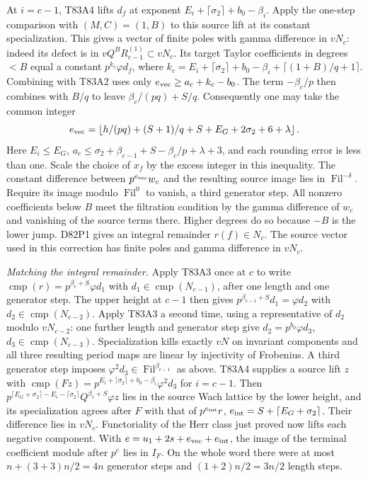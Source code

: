 At $i=c-1$, T83A4 lifts $d_f$ at exponent
$E_i+\lceil\sigma_2\rceil+b_0-\beta_i$.
Apply the one-step comparison with $(M,C)=(1,B)$ to this source
lift at its constant specialization. This gives a vector of
finite poles with gamma difference in $vN_c$: indeed its defect
is in $vQ^B R_{c-1}^{(1)}\subset vN_c$. Its target Taylor
coefficients in degrees $<B$ equal a constant
$p^{k_c}\varphi d_f$, where
$k_c=E_i+\lceil\sigma_2\rceil+b_0-\beta_i+
\lceil(1+B)/q+1\rceil$. Combining with T83A2 uses only
$e_{\rm vec}\ge a_c+k_c-b_0$. The term $-\beta_c/p$
then combines with $B/q$ to leave $\beta_c/(pq)+S/q$.
Consequently one may take the common integer
\[
 e_{\rm vec}=\left\lfloor h/(pq)+(S+1)/q+S+
              E_G+2\sigma_2+6+\lambda\right\rfloor .
\]
Here $E_i\le E_G$, $a_c\le\sigma_2+\beta_{c-1}+S-
\beta_c/p+\lambda+3$, and each rounding error is less than
one. Scale the choice of $x_f$ by the excess integer in this
inequality. The constant difference between $p^{e_{\rm vec}}w_c$
and the resulting source image lies in $\operatorname{Fil}^{-\delta}$.
Require its image modulo $\operatorname{Fil}^0$ to vanish, a third
generator step. All nonzero coefficients below $B$ meet the
filtration condition by the gamma difference of $w_c$ and
vanishing of the source terms there. Higher degrees do so because
$-B$ is the lower jump. D82P1 gives an integral remainder
$r(f)\in N_c$. The source vector used in this correction has
finite poles and gamma difference in $vN_c$.

\emph{Matching the integral remainder.}
Apply T83A3 once at $c$ to write
$\operatorname{cmp}(r)=p^{\beta_c+S}\varphi d_1$
with $d_1\in\operatorname{cmp}(N_{c-1})$, after one length
and one generator step. The upper height at $c-1$ then gives
$p^{\beta_{c-1}+S}d_1=\varphi d_2$ with
$d_2\in\operatorname{cmp}(N_{c-2})$. Apply T83A3 a second
time, using a representative of $d_2$ modulo $vN_{c-2}$:
one further length and generator step give
$d_2=p^{b_0}\varphi d_3$, $d_3\in\operatorname{cmp}(N_{c-3})$.
Specialization kills exactly $vN$ on invariant components and all
three resulting period maps are linear by injectivity of Frobenius.
A third generator step imposes
$\varphi^2d_3\in\operatorname{Fil}^{\beta_{c-1}}$ as above.
T83A4 supplies a source lift $z$ with
$\operatorname{cmp}(Fz)=p^{E_i+\lceil\sigma_2\rceil+b_0-\beta_i}
 \varphi^2d_3$ for $i=c-1$.
Then $p^{\lceil E_G+\sigma_2\rceil-E_i-\lceil\sigma_2\rceil}
Q^{\beta_c+S}\varphi z$ lies in the source Wach lattice by the
lower height, and its specialization agrees after $F$ with that
of $p^{e_{\rm int}}r$, $e_{\rm int}=S+\lceil E_G+\sigma_2\rceil$.
Their difference lies in $vN_c$.
Functoriality of the Herr class just proved now lifts each
negative component. With $e=u_1+2s+e_{\rm vec}+e_{\rm int}$,
the image of the terminal coefficient module after $p^e$ lies
in $I_F$. On the whole word there were at most
$n+(3+3)n/2=4n$ generator steps and $(1+2)n/2=3n/2$ length steps.


